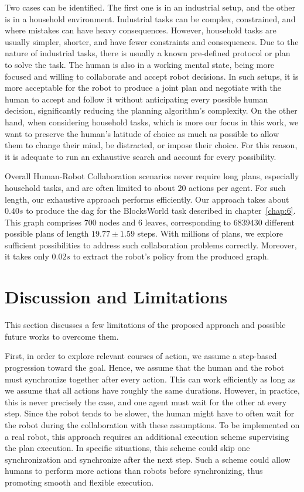 Two cases can be identified. The first one is in an industrial setup, and the other is in a household environment. Industrial tasks can be complex, constrained, and where mistakes can have heavy consequences. However, household tasks are usually simpler, shorter, and have fewer constraints and consequences. Due to the nature of industrial tasks, there is usually a known pre-defined protocol or plan to solve the task. The human is also in a working mental state, being more focused and willing to collaborate and accept robot decisions. In such setups, it is more acceptable for the robot to produce a joint plan and negotiate with the human to accept and follow it without anticipating every possible human decision, significantly reducing the planning algorithm's complexity.
On the other hand, when considering household tasks, which is more our focus in this work, we want to preserve the human's latitude of choice as much as possible to allow them to change their mind, be distracted, or impose their choice. For this reason, it is adequate to run an exhaustive search and account for every possibility. 

Overall Human-Robot Collaboration scenarios never require long plans, especially household tasks, and are often limited to about 20 actions per agent. For such length, our exhaustive approach performs efficiently. Our approach takes about $0.40s$ to produce the \acrshort{dag} for the BlocksWorld task described in chapter~\ref{chap:6}. This graph comprises $700$ nodes and $6$ leaves, corresponding to $6839430$ different possible plans of length $19.77 \pm 1.59$ steps. With millions of plans, we explore sufficient possibilities to address such collaboration problems correctly. Moreover, it takes only $0.02s$ to extract the robot's policy from the produced graph. 



\section{Discussion and Limitations}


This section discusses a few limitations of the proposed approach and possible future works to overcome them. 

First, in order to explore relevant courses of action, we assume a step-based progression toward the goal. Hence, we assume that the human and the robot must synchronize together after every action. This can work efficiently as long as we assume that all actions have roughly the same durations. However, in practice, this is never precisely the case, and one agent must wait for the other at every step. Since the robot tends to be slower, the human might have to often wait for the robot during the collaboration with these assumptions. To be implemented on a real robot, this approach requires an additional execution scheme supervising the plan execution. In specific situations, this scheme could skip one synchronization and synchronize after the next step. Such a scheme could allow humans to perform more actions than robots before synchronizing, thus promoting smooth and flexible execution.

